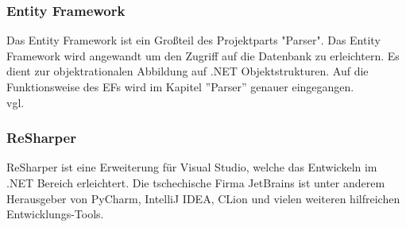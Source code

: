 \subsubsection {Entity Framework}
\label{sec:ef}
Das Entity Framework ist ein Großteil des Projektparts "Parser". Das Entity Framework wird angewandt um den Zugriff auf die Datenbank zu erleichtern. Es dient zur objektrationalen Abbildung auf .NET Objektstrukturen. Auf die Funktionsweise des EFs wird im Kapitel ''Parser'' genauer eingegangen. \\vgl. \cite{entityframework}
\subsubsection {ReSharper}
\label{sec:ReSharper}
ReSharper ist eine Erweiterung für Visual Studio, welche das Entwickeln im .NET Bereich erleichtert. Die tschechische Firma JetBrains ist unter anderem Herausgeber von PyCharm, IntelliJ IDEA,  CLion und vielen weiteren hilfreichen Entwicklungs-Tools. 
